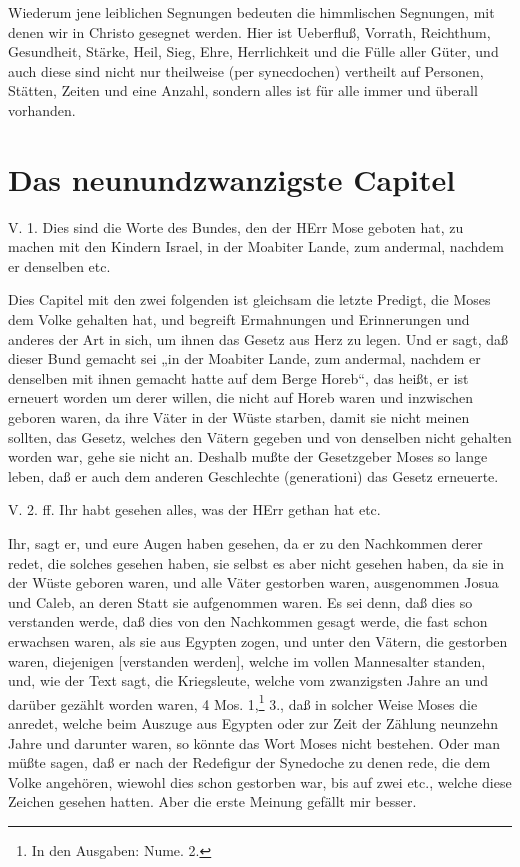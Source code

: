 Wiederum jene leiblichen Segnungen bedeuten die himmlischen Segnungen, mit denen wir in Christo gesegnet werden. Hier ist Ueberfluß, Vorrath, Reichthum, Gesundheit, Stärke, Heil, Sieg, Ehre, Herrlichkeit und die Fülle aller Güter, und auch diese sind nicht nur theilweise (per synecdochen) vertheilt auf Personen, Stätten, Zeiten und eine Anzahl, sondern alles ist für alle immer und überall vorhanden.

\section{Das neunundzwanzigste Capitel}

\begin{schriftzitat}
V. 1. Dies sind die Worte des Bundes, den der HErr Mose geboten hat, zu machen mit den Kindern Israel, in der Moabiter Lande, zum andermal, nachdem er denselben etc.
\end{schriftzitat}

Dies Capitel mit den zwei folgenden ist gleichsam die letzte Predigt, die Moses dem Volke gehalten hat, und begreift Ermahnungen und Erinnerungen und anderes der Art in sich, um ihnen das Gesetz aus Herz zu legen. Und er sagt, daß dieser Bund gemacht sei „in der Moabiter Lande, zum andermal, nachdem er denselben mit ihnen gemacht hatte auf dem Berge Horeb“, das heißt, er ist erneuert worden um derer willen, die nicht auf Horeb waren und inzwischen geboren waren, da ihre Väter in der Wüste starben, damit sie nicht meinen sollten, das Gesetz, welches den Vätern gegeben und von denselben nicht gehalten worden war, gehe sie nicht an. Deshalb mußte der Gesetzgeber Moses so lange leben, daß er auch dem anderen Geschlechte (generationi) das Gesetz erneuerte.

\begin{schriftzitat}
V. 2. ff. Ihr habt gesehen alles, was der HErr gethan hat etc.
\end{schriftzitat}

Ihr, sagt er, und eure Augen haben gesehen, da er zu den Nachkommen derer redet, die solches gesehen haben, sie selbst es aber nicht gesehen haben, da sie in der Wüste geboren waren, und alle Väter gestorben waren, ausgenommen Josua und Caleb, an deren Statt sie aufgenommen waren. Es sei denn, daß dies so verstanden werde, daß dies von den Nachkommen gesagt werde, die fast schon erwachsen waren, als sie aus Egypten zogen, und unter den Vätern, die gestorben waren, diejenigen [verstanden werden], welche im vollen Mannesalter standen, und, wie der Text sagt, die Kriegsleute, welche vom zwanzigsten Jahre an und darüber gezählt worden waren, 4 Mos. 1,\footnote{In den Ausgaben: Nume. 2.} 3., daß in solcher Weise Moses die anredet, welche beim Auszuge aus Egypten oder zur Zeit der Zählung neunzehn Jahre und darunter waren, so könnte das Wort Moses nicht bestehen. Oder man müßte sagen, daß er nach der Redefigur der Synedoche zu denen rede, die dem Volke angehören, wiewohl dies schon gestorben war, bis auf zwei etc., welche diese Zeichen gesehen hatten. Aber die erste Meinung gefällt mir besser.


